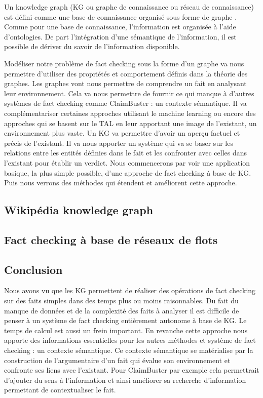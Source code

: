 Un knowledge graph (KG ou graphe de connaissance ou réseau de connaissance) est défini comme une base de connaissance organisé sous forme de graphe \cite{ehrlinger2016towards} \cite{JoStichburyKG}. Comme pour une base de connaissance, l'information est organisée à l'aide d'ontologies. De part l'intégration d'une sémantique de l'information, il est possible de dériver du savoir de l'information disponible. 

Modéliser notre problème de fact checking sous la forme d'un graphe va nous permettre d'utiliser des propriétés et comportement définis dans la théorie des graphes. Les graphes vont nous permettre de comprendre un fait en analysant leur environnement. Cela va nous permettre de fournir ce qui manque à d'autres systèmes de fact checking comme ClaimBuster : un contexte sémantique. Il va complémentariser certaines approches utilisant le machine learning ou encore des approches qui se basent sur le TAL en leur apportant une image de l'existant, un environnement plus vaste. Un KG va permettre d'avoir un aperçu factuel et précis de l'existant. Il va nous apporter un système qui va se baser sur les relations entre les entités définies dans le fait et les confronter avec celles dans l'existant pour établir un verdict. 
Nous commencerons par voir une application basique, la plus simple possible, d'une approche de fact checking à base de KG. Puis nous verrons des méthodes qui étendent et améliorent cette approche.

\subsection{Wikipédia knowledge graph}


\label{sec:wkg}

\subsection{Fact checking à base de réseaux de flots} 



\subsection{Conclusion}

Nous avons vu que les KG permettent de réaliser des opérations de fact checking sur des faits simples dans des temps plus ou moins raisonnables. Du fait du manque de données et de la complexité des faits à analyser il est difficile de penser à un système de fact checking entièrement autonome à base de KG. Le temps de calcul est aussi un frein important. En revanche cette approche nous apporte des informations essentielles pour les autres méthodes et système de fact checking : un contexte sémantique. Ce contexte sémantique se matérialise par la construction de l'argumentaire d'un fait qui évalue son environnement et confronte ses liens avec l'existant. Pour ClaimBuster par exemple cela permettrait d'ajouter du sens à l'information et ainsi améliorer sa recherche d'information permettant de contextualiser le fait.

